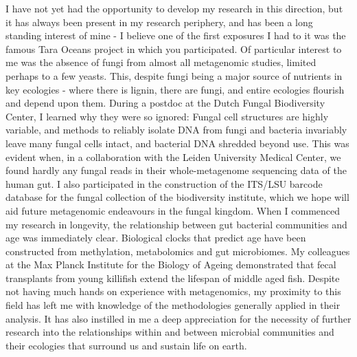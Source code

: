 \documentclass[letterpaper, 10pt]{article} %
\begin{document}
\begin{tcolorbox}[
	blanker,
	width=0.95\textwidth,
	enlarge left by=0.025\textwidth,
	enlarge right by=0.025\textwidth,
	before skip=6pt,
	breakable]
I have not yet had the opportunity to develop my research in this direction, but it has always been present in my research periphery, and has been a long standing interest of mine - I believe one of the first exposures I had to it was the famous Tara Oceans project in which you participated. Of particular interest to me was the absence of fungi from almost all metagenomic studies, limited perhaps to a few yeasts. This, despite fungi being a major source of nutrients in key ecologies - where there is lignin, there are fungi, and entire ecologies flourish and depend upon them. During a postdoc at the Dutch Fungal Biodiversity Center, I learned why they were so ignored: Fungal cell structures are highly variable, and methods to reliably isolate DNA from fungi and bacteria invariably leave many fungal cells intact, and bacterial DNA shredded beyond use. This was evident when, in a collaboration with the Leiden University Medical Center, we found hardly any fungal reads in their whole-metagenome sequencing data of the human gut. I also participated in the construction of the ITS/LSU barcode database for the fungal collection of the biodiversity institute, which we hope will aid future metagenomic endeavours in the fungal kingdom. When I commenced my research in longevity, the relationship between gut bacterial communities and age was immediately clear. Biological clocks that predict age have been constructed from methylation, metabolomics and gut microbiomes. My colleagues at the Max Planck Institute for the Biology of Ageing demonstrated that fecal transplants from young killifish extend the lifespan of middle aged fish. Despite not having much hands on experience with metagenomics, my proximity to this field has left me with knowledge of the methodologies generally applied in their analysis. It has also instilled in me a deep appreciation for the necessity of further research into the relationships within and between microbial communities and their ecologies that surround us and sustain life on earth.


\end{tcolorbox}
\end{document}
